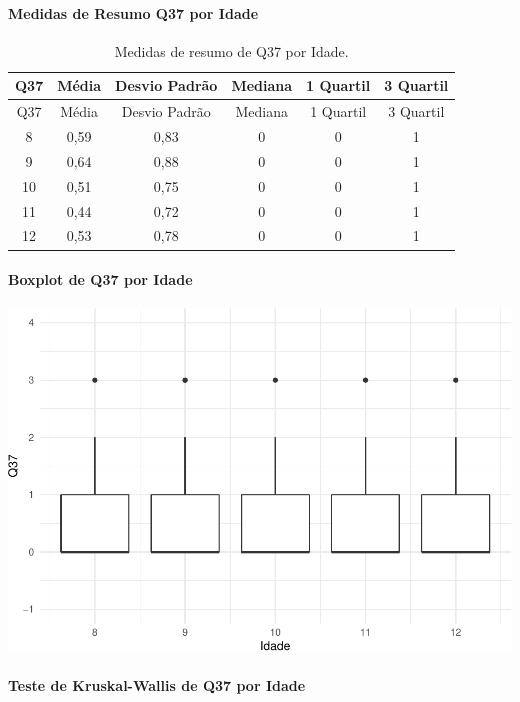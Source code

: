\documentclass[]{article}
\let\oldparagraph\paragraph
\renewcommand{\paragraph}[1]{\oldparagraph{#1}\mbox{}}
\begin{document}
\cleardoublepage

\hypertarget{medidas-de-resumo-q37-por-idade}{%
\paragraph{Medidas de Resumo Q37 por Idade}\label{medidas-de-resumo-q37-por-idade}}

\begin{longtable}[]{@{}cccccc@{}}
\caption{\label{tab:unnamed-chunk-1394}Medidas de resumo de Q37 por Idade.}\tabularnewline
\toprule
Q37 & Média & Desvio Padrão & Mediana & 1 Quartil & 3 Quartil\tabularnewline
\midrule
\endfirsthead
\toprule
Q37 & Média & Desvio Padrão & Mediana & 1 Quartil & 3 Quartil\tabularnewline
\midrule
\endhead
8 & 0,59 & 0,83 & 0 & 0 & 1\tabularnewline
9 & 0,64 & 0,88 & 0 & 0 & 1\tabularnewline
10 & 0,51 & 0,75 & 0 & 0 & 1\tabularnewline
11 & 0,44 & 0,72 & 0 & 0 & 1\tabularnewline
12 & 0,53 & 0,78 & 0 & 0 & 1\tabularnewline
\bottomrule
\end{longtable}

\hypertarget{boxplot-de-q37-por-idade}{%
\paragraph{Boxplot de Q37 por Idade}\label{boxplot-de-q37-por-idade}}

\begin{center}\includegraphics[width=0.75\linewidth]{relatorio_covid19_files/figure-latex/unnamed-chunk-1395-1} \end{center}

\hypertarget{teste-de-kruskal-wallis-de-q37-por-idade}{%
\paragraph{Teste de Kruskal-Wallis de Q37 por Idade}\label{teste-de-kruskal-wallis-de-q37-por-idade}}
\end{document}
